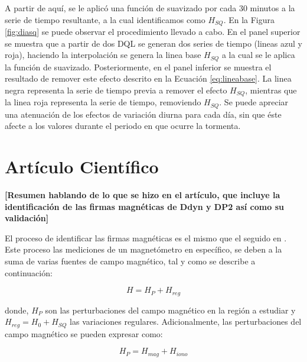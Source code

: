 \documentclass[preprint,12pt]{article}
\begin{document}
A partir de aquí, se le aplicó una función de suavizado por cada 30 minutos \cite{baseline_Gjerloev} a la serie de tiempo resultante, a la cual identificamos como $H_{SQ}$. En la Figura \ref{fig:diasq} se puede observar el procedimiento llevado a cabo. En el panel superior se muestra que a partir de dos DQL se generan dos series de tiempo (lineas azul y roja), haciendo la interpolación se genera la linea base $H_{SQ}$ a la cual se le aplica la función de suavizado. Posteriormente, en el panel inferior se muestra el resultado de remover este efecto descrito en la Ecuación \ref{eq:lineabase}. La linea negra representa la serie de tiempo previa a remover el efecto $H_{SQ}$, mientras que la linea roja representa la serie de tiempo, removiendo $H_{SQ}$. Se puede apreciar una atenuación de los efectos de variación diurna para cada día, sin que éste afecte a los valores durante el periodo en que ocurre la tormenta.\\


\section{Artículo Científico}

\textbf{[Resumen hablando de lo que se hizo en el artículo, que incluye la identificación de las firmas magnéticas de Ddyn y DP2 así como su validación]} 

El proceso de identificar las firmas magnéticas es el mismo que el seguido en \cite{ddyn2005, amorymazaudier_2017, amory2020_filtros}. Este proceso las mediciones de un magnetómetro en específico, se deben a la suma de varias fuentes de campo magnético, tal y como se describe a continuación:

\begin{equation}
	\label{eq:diono1}
	H = H_P+H_{reg}
\end{equation}

\noindent donde, $H_{P}$ son las perturbaciones del campo magnético en la región a estudiar y $H_{reg} =H_0+H_{SQ}$ las variaciones regulares. Adicionalmente, las perturbaciones del campo magnético se pueden expresar como:

\begin{equation}
	\label{eq:pert}
	H_P = H_{mag}+H_{iono}
\end{equation}
\end{document}
